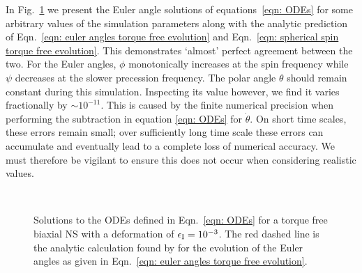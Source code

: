 \documentclass[../full_thesis/full_thesis.tex]{subfiles}
\begin{document}
In Fig.~\ref{fig: biaxial body no torque} we present the Euler angle solutions
of equations~\eqref{eqn: ODEs} for some arbitrary values of the simulation
parameters along with the analytic prediction of Eqn.~\eqref{eqn: euler angles
torque free evolution} and Eqn.~\eqref{eqn: spherical spin torque free
evolution}. This demonstrates `almost' perfect agreement between the two. For
the Euler angles, $\phi$ monotonically
increases at the spin frequency while $\psi$ decreases at the slower precession
frequency. The polar angle $\theta$ should remain constant during this
simulation. Inspecting its value however, we find it varies fractionally by
$\sim 10^{-11}$.  This is caused by the finite numerical precision when
performing the subtraction in equation \eqref{eqn: ODEs} for $\dot{\theta}$. On
short time scales, these errors remain small; over sufficiently long time scale
these errors can accumulate and eventually lead to a complete loss of numerical
accuracy. We must therefore be vigilant to ensure this does not occur when
considering realistic values.
\afterpage{\clearpage}
\begin{figure}[p]
    \centering
{} \\
\caption{Solutions to the ODEs defined in Eqn.~\eqref{eqn: ODEs} for a
torque free biaxial NS with a deformation of $\epsilon_{\mathrm{I}} = 10^{-3}$. The red
dashed line is the analytic calculation found by \citet{Jones2001} for the
evolution of the Euler angles as given in Eqn.~\eqref{eqn: euler angles torque free evolution}.}
\label{fig: biaxial body no torque}
\end{figure}
\end{document}
